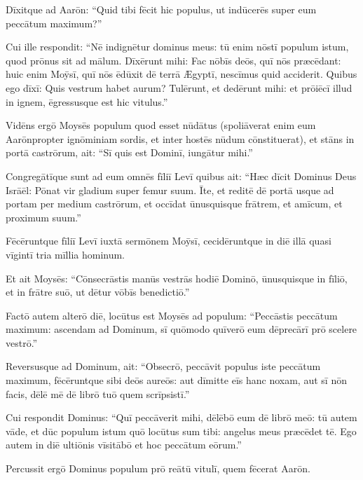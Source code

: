 Dīxitque ad Aarōn: ``Quid
tibi fēcit hic populus, ut indūcerēs super eum peccātum maximum?''

Cui
ille respondit: ``Nē indignētur dominus meus: tū enim nōstī
populum istum, quod prōnus sit ad mālum. 
Dīxērunt mihi: Fac nōbīs
deōs, quī nōs præcēdant: huic enim Moȳsī, quī nōs ēdūxit dē terrā Ægyptī,
nescīmus quid acciderit. 
Quibus ego dīxī: Quis vestrum habet aurum?
Tulērunt, et dedērunt mihi: et prōiēcī illud in ignem, ēgressusque est hic
vitulus.'' 

Vidēns ergō Moysēs populum
quod esset nūdātus (spoliāverat enim eum Aarōn\linebreak propter
ignōminiam sordis, et inter hostēs nūdum cōnstituerat), 
et stāns in portā castrōrum, ait: ``Sī quis est Dominī, iungātur mihi.''

Congregātīque sunt ad eum omnēs fīliī Levī 
quibus ait: ``Hæc dīcit
Dominus Deus Isrāēl: Pōnat vir gladium super femur suum. Īte, et reditē
dē portā usque ad portam per medium castrōrum, et occīdat ūnusquisque
frātrem, et amīcum, et proximum suum.''

Fēcēruntque fīliī Levī iuxtā
sermōnem Moȳsī, cecidēruntque in diē illā quasi vīgintī tria mīllia
hominum. 

Et ait Moysēs: ``Cōnsecrāstis
manūs vestrās hodiē Dominō, ūnusquisque in fīliō, et in frātre suō, ut
dētur vōbīs benedictiō.''

Factō autem alterō diē, locūtus
est Moysēs ad populum: ``Peccāstis peccātum maximum: ascendam ad Dominum,
sī quōmodo quīverō eum dēprecārī prō scelere vestrō.''

Reversusque ad
Dominum, ait: ``Obsec\-rō, peccāvit populus
iste peccātum maximum, fēcēruntque sibi deōs aureōs: aut dīmitte eīs hanc
noxam, 
aut sī nōn facis, dēlē mē dē librō tuō quem
scrīpsistī.'' 

Cui respondit Dominus: ``Quī peccāverit mihi, dēlēbō eum dē
librō meō: 
tū autem vāde, et dūc populum istum quō locūtus sum tibi:
angelus meus præcēdet tē. Ego autem in diē
ultiōnis vīsitābō et hoc peccātum
eōrum.''

Percussit ergō Dominus populum prō reātū vitulī,
quem fēcerat Aarōn. 
